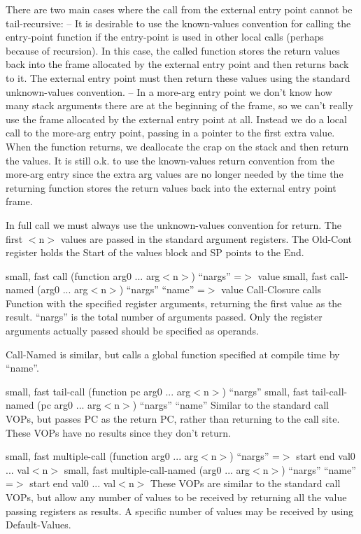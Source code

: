 {\begin{itemize, spread 0, spacing 1}
There are two main cases where the call from the external entry point cannot be
tail-recursive:
 -- It is desirable to use the known-values convention for calling the
    entry-point function if the entry-point is used in other local calls
    (perhaps because of recursion).  In this case, the called function stores
    the return values back into the frame allocated by the external entry point
    and then returns back to it.  The external entry point must then return
    these values using the standard unknown-values convention.
 -- In a more-arg entry point we don't know how many stack arguments there are
    at the beginning of the frame, so we can't really use the frame allocated
    by the external entry point at all.  Instead we do a local call to the
    more-arg entry point, passing in a pointer to the first extra value.  When
    the function returns, we deallocate the crap on the stack and then return
    the values.  It is still o.k. to use the known-values return convention
    from the more-arg entry since the extra arg values are no longer needed by
    the time the returning function stores the return values back into the
    external entry point frame.


In full call we must always use the unknown-values convention for return.  The
first $<$n$>$ values are passed in the standard argument registers.  The Old-Cont
register holds the Start of the values block and SP points to the End.


{small, fast} call (function arg0 ... arg$<$n$>$) ``nargs'' =$>$ value
{small, fast} call-named (arg0 ... arg$<$n$>$) ``nargs'' ``name'' =$>$ value
    Call-Closure calls Function with the specified register arguments,
    returning the first value as the result.  ``nargs'' is the total number of
    arguments passed.  Only the register arguments actually passed should be
    specified as operands.

    Call-Named is similar, but calls a global function specified at compile
    time by ``name''.

{small, fast} tail-call (function pc arg0 ... arg$<$n$>$) ``nargs''
{small, fast} tail-call-named (pc arg0 ... arg$<$n$>$) ``nargs'' ``name''
    Similar to the standard call VOPs, but passes PC as the return PC, rather
    than returning to the call site.  These VOPs have no results since they
    don't return.

{small, fast} multiple-call (function arg0 ... arg$<$n$>$) ``nargs''
                                    =$>$ start end val0 ... val$<$n$>$
{small, fast} multiple-call-named (arg0 ... arg$<$n$>$) ``nargs'' ``name''
                                  =$>$ start end val0 ... val$<$n$>$
    These VOPs are similar to the standard call VOPs, but allow any number of 
    values to be received by returning all the value passing registers as
    results.  A specific number of values may be received by using
    Default-Values. 


\end{itemize, spread 0, spacing 1}}
